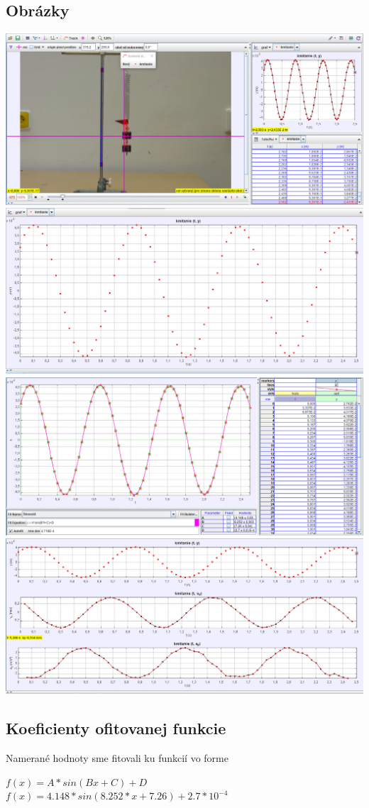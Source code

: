 \documentclass[11pt]{extarticle}
\begin{document}
\subsection{Obrázky}
\begin{center}
\includegraphics[width=.65\textwidth]{printscreen_po_merani}
\vspace{1.5em}
\includegraphics[width=.65\textwidth]{zakladny_graf}
\vspace{1.5em}
\includegraphics[width=.65\textwidth]{ofitovany_graf}
\vspace{1.5em}
\includegraphics[width=.65\textwidth]{tri_grafy}
\end{center}

\subsection{Koeficienty ofitovanej funkcie}
Namerané hodnoty sme fitovali ku funkcií vo forme
\begin{center}
$f(x) = A*sin(Bx+C)+D$\\
$f(x) = 4.148*sin(8.252*x + 7.26) + 2.7*10^{-4}$
\end{center}
\end{document}
